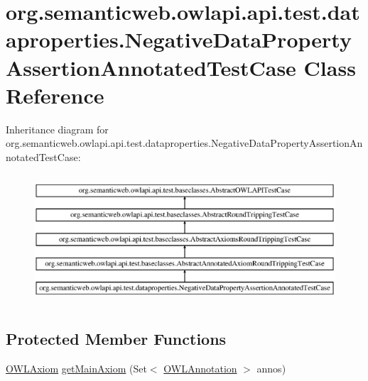\hypertarget{classorg_1_1semanticweb_1_1owlapi_1_1api_1_1test_1_1dataproperties_1_1_negative_data_property_assertion_annotated_test_case}{\section{org.\-semanticweb.\-owlapi.\-api.\-test.\-dataproperties.\-Negative\-Data\-Property\-Assertion\-Annotated\-Test\-Case Class Reference}
\label{classorg_1_1semanticweb_1_1owlapi_1_1api_1_1test_1_1dataproperties_1_1_negative_data_property_assertion_annotated_test_case}
}
Inheritance diagram for org.\-semanticweb.\-owlapi.\-api.\-test.\-dataproperties.\-Negative\-Data\-Property\-Assertion\-Annotated\-Test\-Case\-:\begin{figure}[H]
\begin{center}
\leavevmode
\includegraphics[height=4.869565cm]{classorg_1_1semanticweb_1_1owlapi_1_1api_1_1test_1_1dataproperties_1_1_negative_data_property_assertion_annotated_test_case}
\end{center}
\end{figure}
\subsection*{Protected Member Functions}
\begin{DoxyCompactItemize}
\item 
\hyperlink{interfaceorg_1_1semanticweb_1_1owlapi_1_1model_1_1_o_w_l_axiom}{O\-W\-L\-Axiom} \hyperlink{classorg_1_1semanticweb_1_1owlapi_1_1api_1_1test_1_1dataproperties_1_1_negative_data_property_assertion_annotated_test_case_ac154dbb2e87b44c2b08186d258112370}{get\-Main\-Axiom} (Set$<$ \hyperlink{interfaceorg_1_1semanticweb_1_1owlapi_1_1model_1_1_o_w_l_annotation}{O\-W\-L\-Annotation} $>$ annos)
\end{DoxyCompactItemize}
